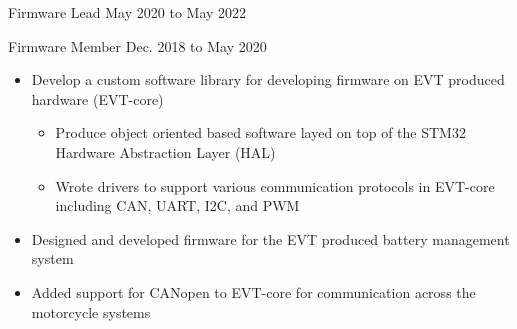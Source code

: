 Firmware Lead \hfill May 2020 to May 2022 \par
Firmware Member \hfill Dec. 2018 to May 2020
\vspace{-10pt}
\begin{itemize}
    \setlength\itemsep{0pt}
    \setlength{\parskip}{0pt}
    \item Develop a custom software library for developing firmware on EVT produced hardware (EVT-core)
    \begin{itemize}
        \setlength\itemsep{0pt}
        \setlength{\parskip}{0pt}
        \item Produce object oriented based software layed on top of the STM32 Hardware Abstraction Layer (HAL)
        \item Wrote drivers to support various communication protocols in EVT-core including CAN, UART, I2C, and PWM
    \end{itemize}
    \item Designed and developed firmware for the EVT produced battery management system
    \item Added support for CANopen to EVT-core for communication across the motorcycle systems
\end{itemize}
